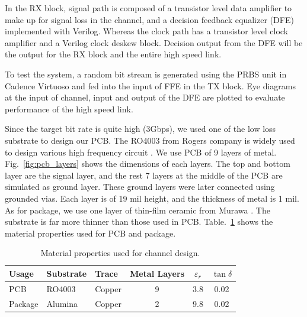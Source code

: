 \documentclass{book}  %
\renewcommand{\section}[1]{\psection{#1}}
\begin{document}
\begin{paper}
In the RX block, signal path is composed of a transistor level data amplifier to make up for signal loss in the channel, and a decision feedback equalizer (DFE) implemented with Verilog. Whereas the clock path has a transistor level clock amplifier and a Verilog clock deskew block. Decision output from the DFE will be the output for the RX block and the entire high speed link.

To test the system, a random bit stream is generated using the PRBS unit in Cadence Virtuoso and fed into the input of FFE in the TX block. Eye diagrams at the input of channel, input and output of the DFE are plotted to evaluate performance of the high speed link.


\section{Channel Design}
\label{sec:channel_design}

Since the target bit rate is quite high (3Gbps), we used one of the low loss substrate to design our PCB. The RO4003 from Rogers company is widely used to design various high frequency circuit \cite{na_ro4003_rogers}. We use PCB of 9 layers of metal. Fig.~\ref{fig:pcb_layers} shows the dimensions of each layers. The top and bottom layer are the signal layer, and the rest 7 layers at the middle of the PCB are simulated as ground layer. These ground layers were later connected using grounded vias. Each layer is of 19 mil height, and the thickness of metal is 1 mil. \\

As for package, we use one layer of thin-film ceramic from Murawa \cite{na_alumina_substratess}. The substrate is far more thinner than those used in PCB. Table.~\ref{table:material} shows the material properties used for PCB and package.

\begin{table}[h]
	\renewcommand{\arraystretch}{1.3}
	\begin{center}
		\begin{tabular}{| l | l | l | c | c | c |}
			\hline
			Usage   & Substrate  & Trace & Metal Layers & $\varepsilon_r$ & $\tan\delta$ \\ \hline
			PCB     & RO4003  \cite{na_ro4003_rogers} & Copper & 9 & 3.8 & 0.02  \\ \hline
			Package & Alumina \cite{na_alumina_substratess} & Copper & 2 & 9.8 & 0.02 \\
			\hline
		\end{tabular}
	\end{center}
	\label{table:material}
	\caption{Material properties used for channel design.}
	\vskip0.2in
\end{table}


\end{paper}
\end{document}
